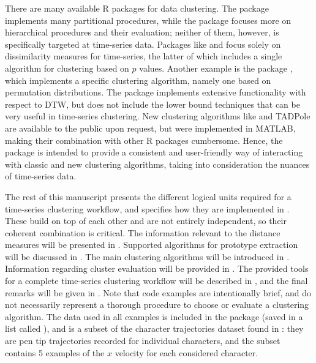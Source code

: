 There are many available R packages for data clustering.
The  package \citep{leisch2006} implements many partitional procedures,
while the  package \citep{cluster} focuses more on hierarchical procedures and their evaluation;
neither of them, however, is specifically targeted at time-series data.
Packages like  \citep{tsdist} and  \citep{montero2014} focus solely on dissimilarity measures for time-series,
the latter of which includes a single algorithm for clustering based on $p$ values.
Another example is the  package \citep{brandmaier2015},
which implements a specific clustering algorithm,
namely one based on permutation distributions.
The  package \citep{giorgino2009} implements extensive functionality with respect to DTW,
but does not include the lower bound techniques that can be very useful in time-series clustering.
New clustering algorithms like \kshape{} \citep{paparrizos2015} and TADPole \citep{begum2015} are available to the public upon request,
but were implemented in MATLAB,
making their combination with other R packages cumbersome.
Hence, the \dtwclust{} package is intended to provide a consistent and user-friendly way of interacting with classic and new clustering algorithms,
taking into consideration the nuances of time-series data.

The rest of this manuscript presents the different logical units required for a time-series clustering workflow,
and specifies how they are implemented in \dtwclust{}.
These build on top of each other and are not entirely independent,
so their coherent combination is critical.
The information relevant to the distance measures will be presented in .
Supported algorithms for prototype extraction will be discussed in .
The main clustering algorithms will be introduced in .
Information regarding cluster evaluation will be provided in .
The provided tools for a complete time-series clustering workflow will be described in ,
and the final remarks will be given in .
Note that code examples are intentionally brief,
and do not necessarily represent a thorough procedure to choose or evaluate a clustering algorithm.
The data used in all examples is included in the package (saved in a list called ),
and is a subset of the character trajectories dataset found in \citet{lichman2013}:
they are pen tip trajectories recorded for individual characters,
and the subset contains 5 examples of the $x$ velocity for each considered character.

